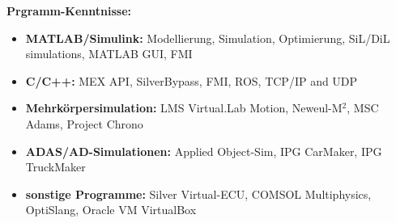 \documentclass{mycv}
\begin{document}
\begin{paracol}{2}
    {
        {\bfseries Prgramm-Kenntnisse:}
        \begin{itemize}
            \item {\bfseries MATLAB/Simulink:} Modellierung, Simulation,
                Optimierung, SiL/DiL simulations, MATLAB GUI, FMI
            \item {\bfseries C/C++:} MEX API, SilverBypass, FMI, ROS, TCP/IP and UDP
            \item{\bfseries Mehrk{\"o}rpersimulation:}  LMS Virtual.Lab Motion, Neweul-M$^2$, 
                MSC Adams, Project Chrono
            \item{\bfseries ADAS/AD-Simulationen:} Applied Object-Sim, IPG CarMaker, IPG TruckMaker
            \item {\bfseries sonstige Programme:}  Silver Virtual-ECU, COMSOL
                Multiphysics, OptiSlang, Oracle VM VirtualBox
        \end{itemize} \par

}
\end{paracol}
\end{document}

